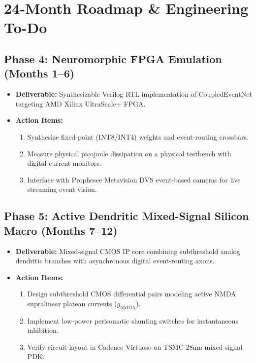 \documentclass[11pt,letterpaper]{report}
\begin{document}
\newpage

\chapter{24-Month Roadmap \& Engineering To-Do}

\section{Phase 4: Neuromorphic FPGA Emulation (Months 1--6)}
\begin{itemize}[leftmargin=*]
    \item \textbf{Deliverable:} Synthesizable Verilog RTL implementation of CoupledEventNet targeting AMD Xilinx UltraScale+ FPGA.
    \item \textbf{Action Items:}
        \begin{enumerate}
            \item Synthesize fixed-point (INT8/INT4) weights and event-routing crossbars.
            \item Measure physical picojoule dissipation on a physical testbench with digital current monitors.
            \item Interface with Prophesee Metavision DVS event-based cameras for live streaming event vision.
        \end{enumerate}
\end{itemize}

\section{Phase 5: Active Dendritic Mixed-Signal Silicon Macro (Months 7--12)}
\begin{itemize}[leftmargin=*]
    \item \textbf{Deliverable:} Mixed-signal CMOS IP core combining subthreshold analog dendritic branches with asynchronous digital event-routing axons.
    \item \textbf{Action Items:}
        \begin{enumerate}
            \item Design subthreshold CMOS differential pairs modeling active NMDA supralinear plateau currents ($g_{\mathrm{NMDA}}$).
            \item Implement low-power perisomatic shunting switches for instantaneous inhibition.
            \item Verify circuit layout in Cadence Virtuoso on TSMC 28nm mixed-signal PDK.
        \end{enumerate}
\end{itemize}
\end{document}
